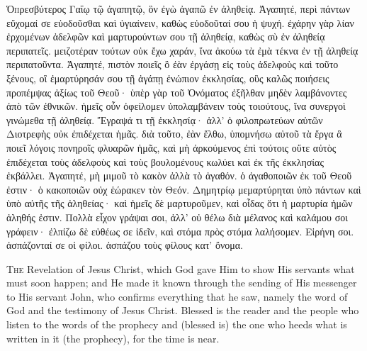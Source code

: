 \begin{pages}
    \begin{Rightside}
        \beginnumbering
		\renewcommand{\LettrineFontHook}{\PHtitl}
		\lettrine[lines=3]{Ὁ} πρεσβύτερος Γαΐῳ τῷ ἀγαπητῷ, ὃν ἐγὼ ἀγαπῶ ἐν ἀληθείᾳ.
		\pend
		\pstart
	 	Ἀγαπητέ, περὶ πάντων εὔχομαί σε εὐοδοῦσθαι καὶ ὑγιαίνειν, καθὼς εὐοδοῦταί σου ἡ ψυχή. ἐχάρην γὰρ λίαν ἐρχομένων ἀδελφῶν καὶ μαρτυρούντων σου τῇ ἀληθείᾳ, καθὼς σὺ ἐν ἀληθείᾳ περιπατεῖς. μειζοτέραν τούτων οὐκ ἔχω χαράν, ἵνα ἀκούω τὰ ἐμὰ τέκνα ἐν τῇ ἀληθείᾳ περιπατοῦντα. Ἀγαπητέ, πιστὸν ποιεῖς ὃ ἐὰν ἐργάσῃ εἰς τοὺς ἀδελφοὺς καὶ τοῦτο ξένους, οἳ ἐμαρτύρησάν σου τῇ ἀγάπῃ ἐνώπιον ἐκκλησίας, οὓς καλῶς ποιήσεις προπέμψας ἀξίως τοῦ Θεοῦ· ὑπὲρ γὰρ τοῦ Ὀνόματος ἐξῆλθαν μηδὲν λαμβάνοντες ἀπὸ τῶν ἐθνικῶν. ἡμεῖς οὖν ὀφείλομεν ὑπολαμβάνειν τοὺς τοιούτους, ἵνα συνεργοὶ γινώμεθα τῇ ἀληθείᾳ.
	 	\pend
	 	\pstart
		 Ἔγραψά τι τῇ ἐκκλησίᾳ· ἀλλ’ ὁ φιλοπρωτεύων αὐτῶν Διοτρεφὴς οὐκ ἐπιδέχεται ἡμᾶς. διὰ τοῦτο, ἐὰν ἔλθω, ὑπομνήσω αὐτοῦ τὰ ἔργα ἃ ποιεῖ λόγοις πονηροῖς φλυαρῶν ἡμᾶς, καὶ μὴ ἀρκούμενος ἐπὶ τούτοις οὔτε αὐτὸς ἐπιδέχεται τοὺς ἀδελφοὺς καὶ τοὺς βουλομένους κωλύει καὶ ἐκ τῆς ἐκκλησίας ἐκβάλλει.
		\pend
		\pstart		
	 	Ἀγαπητέ, μὴ μιμοῦ τὸ κακὸν ἀλλὰ τὸ ἀγαθόν. ὁ ἀγαθοποιῶν ἐκ τοῦ Θεοῦ ἐστιν· ὁ κακοποιῶν οὐχ ἑώρακεν τὸν Θεόν. Δημητρίῳ μεμαρτύρηται ὑπὸ πάντων καὶ ὑπὸ αὐτῆς τῆς ἀληθείας· καὶ ἡμεῖς δὲ μαρτυροῦμεν, καὶ οἶδας ὅτι ἡ μαρτυρία ἡμῶν ἀληθής ἐστιν.
	 	\pend
	 	\pstart
	 	Πολλὰ εἶχον γράψαι σοι, ἀλλ’ οὐ θέλω διὰ μέλανος καὶ καλάμου σοι γράφειν· ἐλπίζω δὲ εὐθέως σε ἰδεῖν, καὶ στόμα πρὸς στόμα λαλήσομεν. Εἰρήνη σοι. ἀσπάζονταί σε οἱ φίλοι. ἀσπάζου τοὺς φίλους κατ’ ὄνομα.
		\pend
        \endnumbering
    \end{Rightside}
    \begin{Leftside}
        \beginnumbering
        		\renewcommand\LettrineFontHook{\Zallmanfamily}
			\lettrine[lines=3]{T}{he} Revelation of Jesus Christ, which God gave Him to show His servants what must soon happen; and He made it known through the sending of His messenger to His servant John, who confirms everything that he saw, namely the word of God and the testimony of Jesus Christ. Blessed is the reader and the people who listen to the words of the prophecy and (blessed is) the one who heeds what is written in it (the prophecy), for the time is near.
		\pend
        \endnumbering
    \end{Leftside}

\end{pages} 
\Pages

